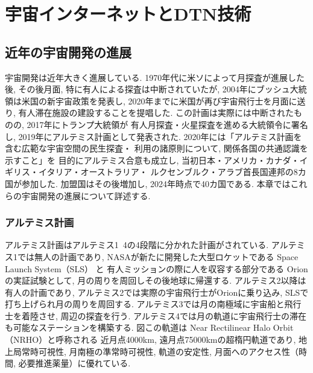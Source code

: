 \chapter{宇宙インターネットとDTN技術}
\label{chap:prerequisite_knowledge}

\section{近年の宇宙開発の進展}
宇宙開発は近年大きく進展している. 1970年代に米ソによって月探査が進展した後, 
その後月面, 特に有人による探査は中断されていたが, 
2004年にブッシュ大統領は米国の新宇宙政策を発表し, 
2020年までに米国が再び宇宙飛行士を月面に送り, 
有人滞在施設の建設することを提唱した\cite{久保田2009}.
この計画は実際には中断されたものの, 2017年にトランプ大統領が
有人月探査・火星探査を進める大統領令に署名し, 
2019年にアルテミス計画として発表された\cite{nasa2020}.
2020年には「アルテミス計画を含む広範な宇宙空間の民生探査・
利用の諸原則について, 関係各国の共通認識を示すこと」を
目的にアルテミス合意\cite{artemis_agreement1}も成立し, 
当初日本・アメリカ・カナダ・イギリス・イタリア・オーストラリア・
ルクセンブルク・アラブ首長国連邦の8カ国が参加した\cite{artemis_agreement2}. 
加盟国はその後増加し, 2024年時点で40カ国である\cite{artemis_agreement3}. 
本章ではこれらの宇宙開発の進展について詳述する. 

\subsection{アルテミス計画}
\label{section:月・火星の探査計画}
アルテミス計画はアルテミス1~4の4段階に分かれた計画がされている. 
アルテミス1では無人の計画であり, NASAが新たに開発した大型ロケットである
Space Launch System（SLS） と 有人ミッションの際に人を収容する部分である
Orionの実証試験として, 月の周りを周回しその後地球に帰還する. アルテミス2以降は有人の計画であり, 
アルテミス2では実際の宇宙飛行士がOrionに乗り込み, SLSで打ち上げられ月の周りを周回する. 
アルテミス3では月の南極域に宇宙船と飛行士を着陸させ, 周辺の探査を行う. 
アルテミス4では月の軌道に宇宙飛行士の滞在も可能なステーションを構築する. 
図この軌道は Near Rectilinear Halo Orbit （NRHO）と呼称される
近⽉点4000km, 遠⽉点75000kmの超楕円軌道であり, 
地上局常時可視性, 月南極の準常時可視性, 軌道の安定性, 
月面へのアクセス性（時間, 必要推進薬量）に優れている\cite{kiban_dai48}. 


